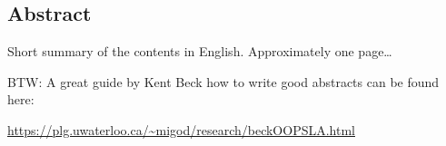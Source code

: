 

\begin{otherlanguage}{american}
	\chapter*{Abstract}
	Short summary of the contents in English. Approximately one page\dots
	\medskip
	
	\noindent
	BTW: A great guide by Kent Beck how to write good abstracts can be found here:
	\begin{center}
		\url{https://plg.uwaterloo.ca/~migod/research/beckOOPSLA.html}
	\end{center}
\end{otherlanguage}
